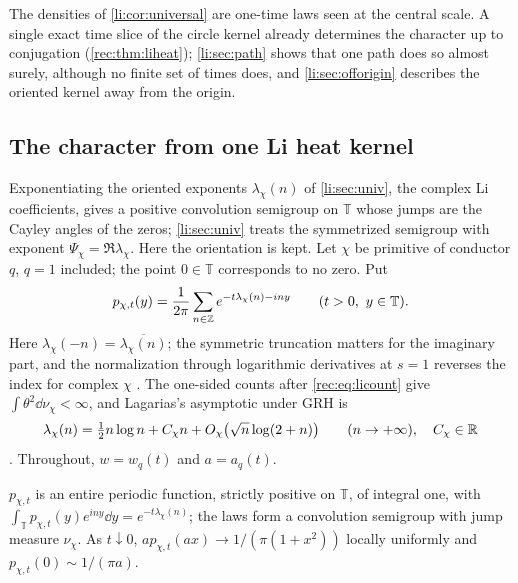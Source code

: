 The densities of \cref{li:cor:universal} are one-time laws seen at the central scale. A single
exact time slice of the circle kernel already determines the character up to conjugation
(\cref{rec:thm:liheat}); \cref{li:sec:path} shows that one path does so almost surely, although no
finite set of times does, and \cref{li:sec:offorigin} describes the oriented kernel away from the
origin.




\subsection{The character from one Li heat kernel}\label{rec:sec:liheat}

Exponentiating the oriented exponents $\lambda_\chi(n)$ of \cref{li:sec:univ}, the complex Li
coefficients, gives a positive convolution semigroup on $\mathbb T$ whose jumps are the Cayley angles of
the zeros; \cref{li:sec:univ} treats the symmetrized semigroup with exponent $\Psi_\chi=\Re\lambda_\chi$. Here
the orientation is kept. Let $\chi$ be primitive of conductor $q$, $q=1$ included; the point $0\in\mathbb T$
corresponds to no zero. Put
\[
 p_{\chi,t}(y)=\frac1{2\pi}\sum_{n\in\Z}e^{-t\lambda_\chi(n)-iny}\qquad(t>0,\ y\in\mathbb T).
\]
Here $\lambda_\chi(-n)=\overline{\lambda_\chi(n)}$; the symmetric truncation matters for the imaginary part, and
the normalization through logarithmic derivatives at $s=1$ reverses the index for complex $\chi$
\cite{Lagarias2007Li}. The one-sided counts after \eqref{rec:eq:licount} give $\int\theta^2\dd\nu_\chi<\infty$,
and Lagarias's asymptotic under GRH is
\begin{equation}\label{rec:eq:lagarias}
 \lambda_\chi(n)=\tfrac12n\log n+C_\chi n+O_\chi\bigl(\sqrt n\log(2+n)\bigr)\qquad(n\to+\infty),\quad C_\chi\in\mathbb{R}
\end{equation}
\cite{Lagarias2007Li}. Throughout, $w=w_q(t)$ and $a=a_q(t)$.

\begin{proposition}\label{rec:prop:liheat}
$p_{\chi,t}$ is an entire periodic function, strictly positive on $\mathbb T$, of integral one, with
$\int_{\mathbb T}p_{\chi,t}(y)e^{iny}\dd y=e^{-t\lambda_\chi(n)}$; the laws form a convolution semigroup with jump measure $\nu_\chi$. As
$t\downarrow0$, $ap_{\chi,t}(ax)\to1/(\pi(1+x^2))$ locally uniformly and $p_{\chi,t}(0)\sim1/(\pi a)$.
\end{proposition}

